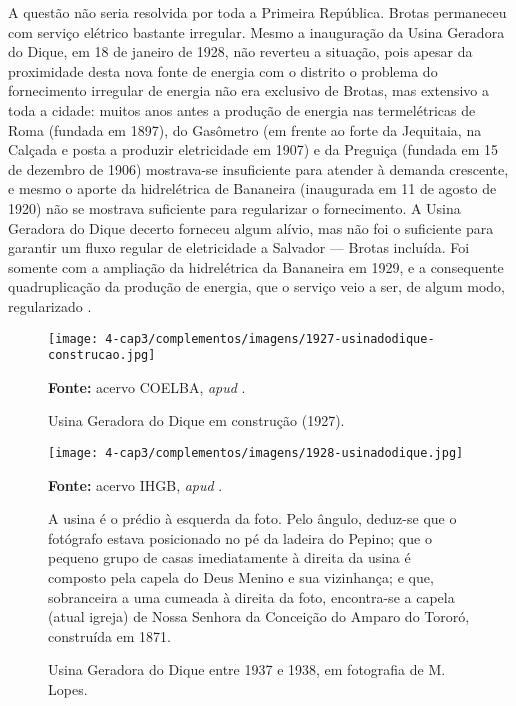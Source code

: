 A questão não seria resolvida por toda a Primeira República. Brotas permaneceu com serviço elétrico bastante irregular. Mesmo a inauguração da Usina Geradora do Dique, em 18 de janeiro de 1928, não reverteu a situação, pois apesar da proximidade desta nova fonte de energia com o distrito o problema do fornecimento irregular de energia não era exclusivo de Brotas, mas extensivo a toda a cidade: muitos anos antes a produção de energia nas termelétricas de Roma (fundada em 1897), do Gasômetro (em frente ao forte da Jequitaia, na Calçada e posta a produzir eletricidade em 1907) e da Preguiça (fundada em 15 de dezembro de 1906) mostrava-se insuficiente para atender à demanda crescente, e mesmo o aporte da hidrelétrica de Bananeira (inaugurada em 11 de agosto de 1920) não se mostrava suficiente para regularizar o fornecimento. A Usina Geradora do Dique decerto forneceu algum alívio, mas não foi o suficiente para garantir um fluxo regular de eletricidade a Salvador --- Brotas incluída. Foi somente com a ampliação da hidrelétrica da Bananeira em 1929, e a consequente quadruplicação da produção de energia, que o serviço veio a ser, de algum modo, regularizado \cite{reboucas_eletricidade_2018}.

\begin{figure}[!htp]
\centering
\caption{Usina Geradora do Dique em construção (1927).}
\texttt{[image: 4-cap3/complementos/imagens/1927-usinadodique-construcao.jpg]}{\par \footnotesize \textbf{Fonte:} acervo COELBA, \textit{apud} .}
\label{fig:usinadiqueconstrucao}
\end{figure}

\begin{figure}[!htp]
\centering
\caption{Usina Geradora do Dique entre 1937 e 1938, em fotografia de M. Lopes.}
\texttt{[image: 4-cap3/complementos/imagens/1928-usinadodique.jpg]}{\par \footnotesize \textbf{Fonte:} acervo IHGB, \textit{apud} . \par A usina é o prédio à esquerda da foto. Pelo ângulo, deduz-se que o fotógrafo estava posicionado no pé da ladeira do Pepino; que o pequeno grupo de casas imediatamente à direita da usina é composto pela capela do Deus Menino e sua vizinhança; e que, sobranceira a uma cumeada à direita da foto, encontra-se a capela (atual igreja) de Nossa Senhora da Conceição do Amparo do Tororó, construída em 1871.}
\label{fig:usinadique}
\end{figure}

